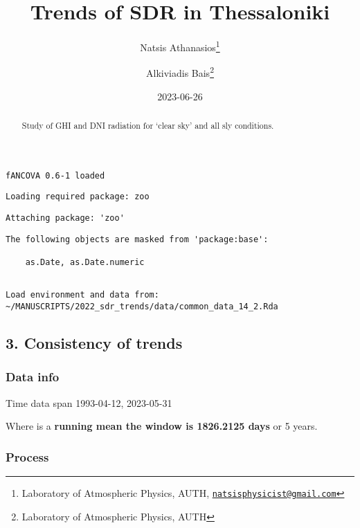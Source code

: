 \documentclass[
  10pt,
  a4paper,oneside]{article}
\title{Trends of SDR in Thessaloniki}
\author{Natsis Athanasios\footnote{Laboratory of Atmospheric Physics, AUTH, \href{mailto:natsisphysicist@gmail.com}{\nolinkurl{natsisphysicist@gmail.com}}} \and Alkiviadis Bais\footnote{Laboratory of Atmospheric Physics, AUTH}}
\date{2023-06-26}
\begin{document}
\maketitle
\begin{abstract}
Study of GHI and DNI radiation for `clear sky' and all sly conditions.
\end{abstract}

{
\hypersetup{linkcolor=}
\setcounter{tocdepth}{4}
\tableofcontents
}
\begin{verbatim}
fANCOVA 0.6-1 loaded
\end{verbatim}

\begin{verbatim}
Loading required package: zoo
\end{verbatim}

\begin{verbatim}
Attaching package: 'zoo'
\end{verbatim}

\begin{verbatim}
The following objects are masked from 'package:base':

    as.Date, as.Date.numeric
\end{verbatim}

\begin{verbatim}

Load environment and data from:  ~/MANUSCRIPTS/2022_sdr_trends/data/common_data_14_2.Rda 
\end{verbatim}

\hypertarget{consistency-of-trends}{%
\subsection{3. Consistency of trends}\label{consistency-of-trends}}

\hypertarget{data-info}{%
\subsubsection{Data info}\label{data-info}}

Time data span 1993-04-12, 2023-05-31

Where is a \textbf{running mean the window is 1826.2125 days} or
5 years.

\hypertarget{process}{%
\subsubsection{Process}\label{process}}

\newpage
\FloatBarrier
\end{document}
